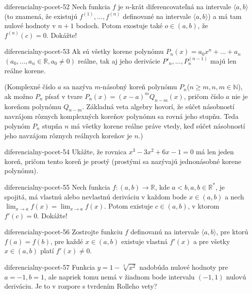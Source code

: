\begin{defproblem}{diferencialny-pocet-52}
Nech funkcia $f$ je $n$-krát diferencovateľná na intervale $\langle a,b \rangle$ (to znamená, že existujú $f^{(1)},...,f^{(n)}$ definované na intervale $\langle a,b \rangle$) a má tam nulové hodnoty v $n+1$ bodoch. Potom exostuje také $o\in (a,b)$, že $f^{(n)}(c)=0$. Dokážte!
\end{defproblem}

\begin{defproblem}{diferencialny-pocet-53}
Ak sú všetky korene polynómu $P_n(x)=a_0x^n+...+a_n$ $(a_0,...,a_n\in\mathbb{R},a_0\neq 0)$ reálne, tak aj jeho derivácie $P'_n,...,P_n^{(n-1)}$ majú len reálne korene.

(Komplexné číslo $a$ sa nazýva $m$-násobný koreň polynómu $P_n$($n\geq m,n,m\in\mathbb{N}$), ak možno $P_n$ písať v tvare $P_n(x)=(x-a)^mQ_{n-m}(x)$, pričom číslo $a$ nie je koreňom polynómu $Q_{n-m}$. Základná veta algebry hovorí, že súčet násobností navzájom rôznych komplexných koreňov polynómu sa rovná jeho stupňu. Teda polynóm $P_n$ stupňa $n$ má všetky korene reálne práve vtedy, keď súčet násobností jeho navzájom rôznych reálnych koreňov je $n$.)
\end{defproblem}

\begin{defproblem}{diferencialny-pocet-54}
Ukážte, že rovnica $x^3-3x^2+6x-1=0$ má len jeden koreň, pričom tento koreň je prostý (prostými sa nazývajú jednonásobné korene polynómu).
\end{defproblem}

\begin{defproblem}{diferencialny-pocet-55}
Nech funkcia $f:(a,b)\rightarrow\mathbb{R}$, kde $a<b,a,b\in\mathbb{R^*}$, je spojitá, má vlastnú alebo nevlastnú deriváciu v každom bode $x\in (a,b)$ a nech $\lim_{x\rightarrow a}f(x)=\lim_{x\rightarrow a}f(x)$. Potom existuje $c\in (a,b)$, v ktorom $f'(c)=0$. Dokážte!
\end{defproblem}

\begin{defproblem}{diferencialny-pocet-56}
Zostrojte funkciu $f$ definovanú na intervale $\langle a,b \rangle$, pre ktorú $f(a)=f(b)$, pre každé $x\in (a,b)$ existuje vlastná $f'(x)$ a pre všetky $x\in (a,b)$ platí $f'(x)\neq 0$.
\end{defproblem}

\begin{defproblem}{diferencialny-pocet-57}
Funkcia $y=1-\sqrt[3]{x^2}$ nadobúda nulové hodnoty pre $a=-1,b=1$, ale napriek tomu nemá v žiadnom bode intervalu $(-1,1)$ nulovú deriváciu. Je to v rozpore s tvrdením Rolleho vety?
\end{defproblem}


